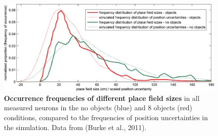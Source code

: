 \begin{figure}[!ht]
	\begin{center}
		\includegraphics[width=\textwidth]{img/burkefreqdist}
	\end{center}
	\caption{
		{\bf Occurrence frequencies of different place field sizes} in all measured neurons in the no
		objects (blue) and 8 objects (red) conditions, compared to the frequencies of position uncertainties in
		the simulation. Data from (Burke et al., 2011). 
	}
	\label{distr}
\end{figure}



%
%
%
%
%
%
%
%
%
%

%